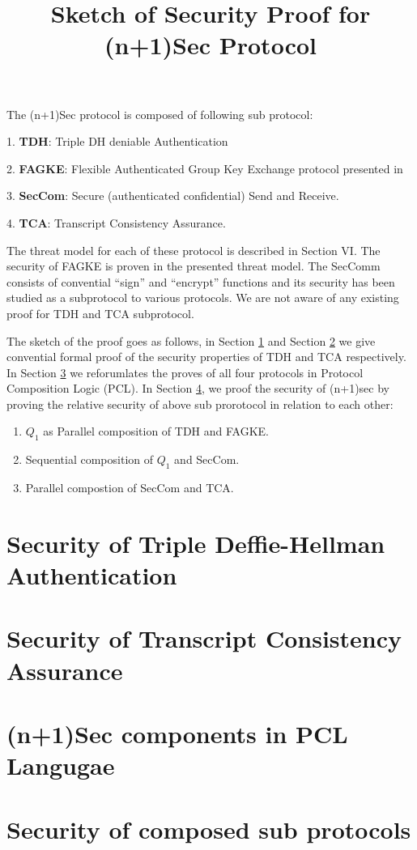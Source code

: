 \documentclass{article}
\newcommand{\tmstrong}[1]{\textbf{#1}}
\begin{document}
\title{Sketch of Security Proof for (n+1)Sec Protocol}

\maketitle

The (n+1)Sec protocol is composed of following sub protocol:
\begin{enumerate}
  1. {\tmstrong{TDH}}: Triple DH deniable Authentication
  
  2. {\tmstrong{FAGKE}}: Flexible Authenticated Group Key Exchange protocol
  presented in {\cite{AMP10}}
  
  3. {\tmstrong{SecCom}}: Secure (authenticated confidential) Send and
  Receive.
  
  4. {\tmstrong{TCA}}: Transcript Consistency Assurance.
\end{enumerate}
The threat model for each of these protocol is described in Section VI. The
security of FAGKE is proven in the presented threat model. The SecComm
consists of convential ``sign'' and ``encrypt'' functions and its security has
been studied as a subprotocol to various protocols. We are not aware of any
existing proof for TDH and TCA subprotocol.

The sketch of the proof goes as follows, in Section \ref{sect-tdh-sec} and
Section \ref{sect-tca-sec} we give convential formal proof of the security
properties of TDH and TCA respectively. In Section \ref{sect-np1sec-pclize} we
reforumlates the proves of all four protocols in Protocol Composition Logic
(PCL). In Section \ref{sect-comp-sec}, we proof the security of (n+1)sec by
proving the relative security of above sub prorotocol in relation to each
other:
\begin{enumerate}
  \item $Q_1$ as Parallel composition of TDH and FAGKE.
  
  \item Sequential composition of $Q_1$ and SecCom.
  
  \item  Parallel compostion of SecCom and TCA.
\end{enumerate}

\section{Security of Triple Deffie-Hellman Authentication}

\label{sect-tdh-sec}

\section{Security of Transcript Consistency Assurance}

\label{sect-tca-sec}

\section{(n+1)Sec components in PCL Langugae}

\label{sect-np1sec-pclize}

\section{Security of composed sub protocols}

\label{sect-comp-sec}
\end{document}

